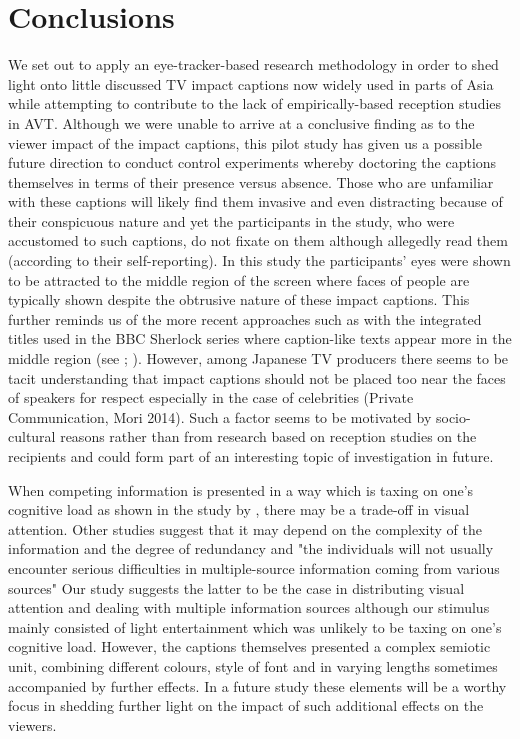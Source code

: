 \documentclass[output=paper]{langsci/langscibook}
\begin{document}
\section{Conclusions}

We set out to apply an eye-tracker-based research methodology in order to shed light onto little discussed TV impact captions now widely used in parts of Asia while attempting to contribute to the lack of empirically-based reception studies in AVT. Although we were unable to arrive at a conclusive finding as to the viewer impact of the impact captions, this pilot study has given us a possible future direction to conduct control experiments whereby doctoring the captions themselves in terms of their presence versus absence. Those who are unfamiliar with these captions will likely find them invasive and even distracting because of their conspicuous nature and yet the participants in the study, who were accustomed to such captions, do not fixate on them although allegedly read them (according to their self-reporting). In this study the participants' eyes were shown to be attracted to the middle region of the screen where faces of people are typically shown despite the obtrusive nature of these impact captions. This further reminds us of the more recent approaches such as with the integrated titles used in the BBC Sherlock series where caption-like texts appear more in the middle region (see \citet{Sasamoto2014}; \citet{Dwyer2015}).  However, among Japanese TV producers there seems to be tacit understanding that impact captions should not be placed too near the faces of speakers for respect especially in the case of celebrities (Private Communication, Mori 2014).  Such a factor seems to be motivated by socio-cultural reasons rather than from research based on reception studies on the recipients and could form part of an interesting topic of investigation in future. 


When competing information is presented in a way which is taxing on one's cognitive load as shown in the study by \citet{caffrey2009}, there may be a trade-off in visual attention.  Other studies \citep[pg. 265]{perego2010} suggest that it may depend on the complexity of the information and the degree of redundancy and "the individuals will not usually encounter serious difficulties in multiple-source information coming from various sources" Our study suggests the latter to be the case in distributing visual attention and dealing with multiple information sources although our stimulus mainly consisted of light entertainment which was unlikely to be taxing on one's cognitive load.  However, the captions themselves presented a complex semiotic unit, combining different colours, style of font and in varying lengths sometimes accompanied by further effects. In a future study these elements will be a worthy focus in shedding further light on the impact of such additional effects on the viewers. 
\end{document}
